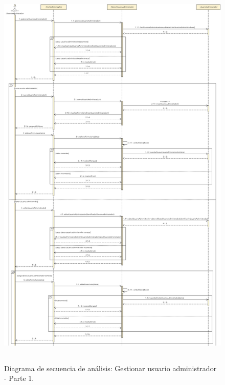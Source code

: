 \documentclass[12pt,a4paper, twoside]{report}
\begin{document}
\begin{itemize}
		\begin{figure}[!ht]   
			\caption{Diagrama de secuencia de análisis: Gestionar usuario administrador - Parte 1.} 
			\begin{center} 
	 			\includegraphics[width=17cm,height=18.5cm]{Images/analysis/secuencia/secuencia_gestionarUsuarioAdministrador_parte1} \\
				\label{fig:ds_adminuser1} 
			\end{center}  
		\end{figure} 
		
		\newpage
		

\end{itemize}
\end{document}

